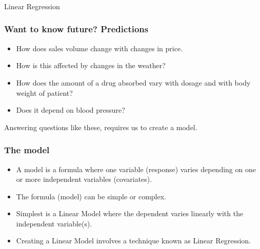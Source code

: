 \begin{frame}[fragile]\frametitle{}
\begin{center}
{\Large Linear Regression}
\end{center}
\end{frame}

\begin{frame}[fragile]\frametitle{Want to know future? Predictions}
\begin{itemize}
\item How does sales volume change with changes in price. 
\item How is this affected by changes in the weather?
\item How does the amount of a drug absorbed vary with dosage and with body weight of patient? 
\item Does it depend on blood pressure?
\end{itemize}
Answering questions like these, requires us to create a model.
\end{frame}

\begin{frame}[fragile]\frametitle{The model}
\begin{itemize}
\item A model is a formula where one variable (response) varies depending on one or more independent variables (covariates). 
\item The formula (model) can be simple or complex.
\item Simplest is a Linear Model where the dependent varies linearly with the independent variable(s).
\item Creating a Linear Model involves a technique known as Linear Regression.
\end{itemize}
\end{frame}

